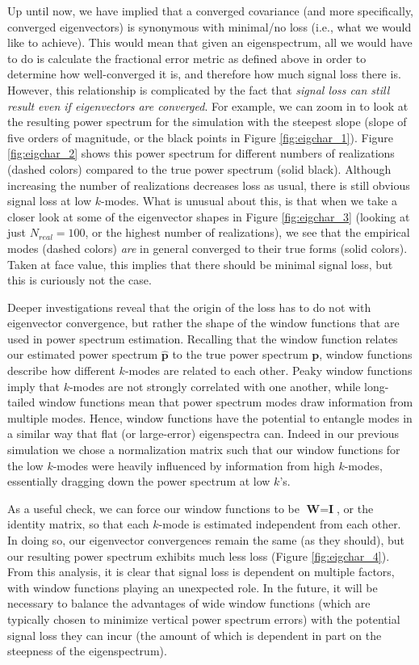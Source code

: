 Up until now, we have implied that a converged covariance (and more specifically, converged eigenvectors) is synonymous with minimal/no loss (i.e., what we would like to achieve). This would mean that given an eigenspectrum, all we would have to do is calculate the fractional error metric as defined above in order to determine how well-converged it is, and therefore how much signal loss there is. However, this relationship is complicated by the fact that \textit{signal loss can still result even if eigenvectors are converged}. For example, we can zoom in to look at the resulting power spectrum for the simulation with the steepest slope (slope of five orders of magnitude, or the black points in Figure \ref{fig:eigchar_1}). Figure \ref{fig:eigchar_2} shows this power spectrum for different numbers of realizations (dashed colors) compared to the true power spectrum (solid black). Although increasing the number of realizations decreases loss as usual, there is still obvious signal loss at low $k$-modes. What is unusual about this, is that when we take a closer look at some of the eigenvector shapes in Figure \ref{fig:eigchar_3} (looking at just $N_{real}=100$, or the highest number of realizations), we see that the empirical modes (dashed colors) \textit{are} in general converged to their true forms (solid colors). Taken at face value, this implies that there should be minimal signal loss, but this is curiously not the case.

Deeper investigations reveal that the origin of the loss has to do not with eigenvector convergence, but rather the shape of the window functions that are used in power spectrum estimation. Recalling that the window function relates our estimated power spectrum $\widehat{\textbf{p}}$ to the true power spectrum $\textbf{p}$, window functions describe how different $k$-modes are related to each other. Peaky window functions imply that $k$-modes are not strongly correlated with one another, while long-tailed window functions mean that power spectrum modes draw information from multiple modes. Hence, window functions have the potential to entangle modes in a similar way that flat (or large-error) eigenspectra can. Indeed in our previous simulation we chose a normalization matrix such that our window functions for the low $k$-modes were heavily influenced by information from high $k$-modes, essentially dragging down the power spectrum at low $k$'s.

As a useful check, we can force our window functions to be $\textbf{W} = \textbf{I}$, or the identity matrix, so that each $k$-mode is estimated independent from each other. In doing so, our eigenvector convergences remain the same (as they should), but our resulting power spectrum exhibits much less loss (Figure \ref{fig:eigchar_4}). From this analysis, it is clear that signal loss is dependent on multiple factors, with window functions playing an unexpected role. In the future, it will be necessary to balance the advantages of wide window functions (which are typically chosen to minimize vertical power spectrum errors) with the potential signal loss they can incur (the amount of which is dependent in part on the steepness of the eigenspectrum).

